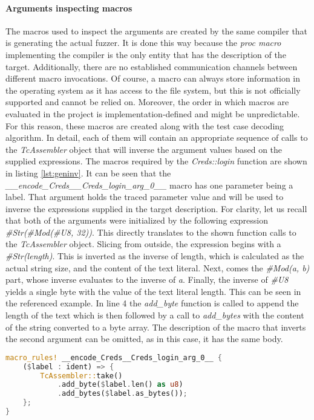 \paragraph{Arguments inspecting macros}
The macros used to inspect the arguments are created by the same compiler that is generating the actual fuzzer. It is done this way because the \textit{proc macro} implementing the compiler is the only entity that has the description of the target. Additionally, there are no established communication channels between different macro invocations. Of course, a macro can always store information in the operating system as it has access to the file system, but this is not officially supported and cannot be relied on. Moreover, the order in which macros are evaluated in the project is implementation-defined and might be unpredictable. For this reason, these macros are created along with the test case decoding algorithm. In detail, each of them will contain an appropriate sequence of calls to the \textit{TcAssembler} object that will inverse the argument values based on the supplied expressions. The macros required by the \textit{Creds::login} function are shown in listing \ref{lst:geninv}. It can be seen that the \textit{\_\_encode\_Creds\_\_Creds\_login\_arg\_0\_\_} macro has one parameter being a label. That argument holds the traced parameter value and will be used to inverse the expressions supplied in the target description. For clarity, let us recall that both of the arguments were initialized by the following expression \textit{\#Str(\#Mod(\#U8, 32))}. This directly translates to the shown function calls to the \textit{TcAssembler} object. Slicing from outside, the expression begins with a \textit{\#Str(length)}. This is inverted as the inverse of length, which is calculated as the actual string size, and the content of the text literal. Next, comes the \textit{\#Mod(a, b)} part, whose inverse evaluates to the inverse of \textit{a}. Finally, the inverse of \textit{\#U8} yields a single byte with the value of the text literal length. This can be seen in the referenced example. In line 4 the \textit{add\_byte} function is called to append the length of the text which is then followed by a call to \textit{add\_bytes} with the content of the string converted to a byte array. The description of the macro that inverts the second argument can be omitted, as in this case, it has the same body.

\begin{minipage}{\linewidth}
\begin{lstlisting}[language=rust,caption={Generated macros which inverse the arguments.},label={lst:geninv}]
macro_rules! __encode_Creds__Creds_login_arg_0__ {
    ($label : ident) => {
        TcAssembler::take()
            .add_byte($label.len() as u8)
            .add_bytes($label.as_bytes());
    };
}
\end{lstlisting}
\end{minipage}

